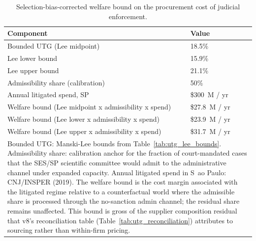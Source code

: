 \begin{table}

\caption{\label{tab:welfare_bound}Selection-bias-corrected welfare bound on the procurement cost of judicial enforcement.}
\centering
\begin{tabular}[t]{ll}
\toprule
Component & Value\\
\midrule
Bounded UTG (Lee midpoint) & 18.5\%\\
Lee lower bound & 15.9\%\\
Lee upper bound & 21.1\%\\
Admissibility share (calibration) & 50\%\\
Annual litigated spend, SP & \$300~M / yr\\
\addlinespace
Welfare bound (Lee midpoint x admissibility x spend) & \$27.8~M / yr\\
Welfare bound (Lee lower x admissibility x spend) & \$23.9~M / yr\\
Welfare bound (Lee upper x admissibility x spend) & \$31.7~M / yr\\
\bottomrule
\multicolumn{2}{l}{\rule{0pt}{1em}Bounded UTG: Manski-Lee bounds from Table~\ref{tab:utg_lee_bounds}. Admissibility share: calibration anchor for the fraction of court-mandated cases that the SES/SP scientific committee would admit to the administrative channel under expanded capacity. Annual litigated spend in S~ao Paulo: CNJ/INSPER (2019). The welfare bound is the cost margin associated with the litigated regime relative to a counterfactual world where the admissible share is processed through the no-sanction admin channel; the residual share remains unaffected. This bound is gross of the supplier composition residual that v8's reconciliation table (Table~\ref{tab:utg_reconciliation}) attributes to sourcing rather than within-firm pricing.}\\
\end{tabular}
\end{table}
